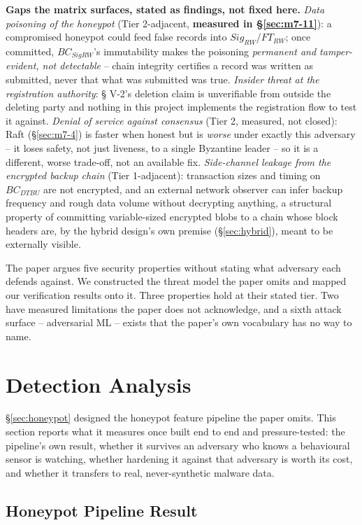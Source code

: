 \documentclass[conference]{IEEEtran}
\begin{document}
\textbf{Gaps the matrix surfaces, stated as findings, not fixed here.} \textit{Data poisoning of
the honeypot} (Tier 2-adjacent, \textbf{measured in \S\ref{sec:m7-11}}): a compromised honeypot
could feed false records into $Sig_{RW}$/$FT_{RW}$; once committed, $BC_{SigRW}$'s immutability
makes the poisoning \emph{permanent and tamper-evident, not detectable} -- chain integrity
certifies a record was written as submitted, never that what was submitted was true.
\textit{Insider threat at the registration authority}: \S
V-2's deletion claim is unverifiable from outside the deleting party and nothing in this project
implements the registration flow to test it against. \textit{Denial of service against consensus}
(Tier 2, measured, not closed): Raft (\S\ref{sec:m7-4}) is faster when honest but is
\emph{worse} under exactly this adversary -- it loses safety, not just liveness, to a single
Byzantine leader -- so it is a different, worse trade-off, not an available fix.
\textit{Side-channel leakage from the encrypted backup chain} (Tier 1-adjacent): transaction sizes
and timing on $BC_{DTBU}$ are not encrypted, and an external network observer can infer backup
frequency and rough data volume without decrypting anything, a structural property of committing
variable-sized encrypted blobs to a chain whose block headers are, by the hybrid design's own
premise (\S\ref{sec:hybrid}), meant to be externally visible.

The paper argues five security properties without stating what adversary each defends against. We
constructed the threat model the paper omits and mapped our verification results onto it. Three
properties hold at their stated tier. Two have measured limitations the paper does not
acknowledge, and a sixth attack surface -- adversarial ML -- exists that the paper's own
vocabulary has no way to name.
\section{Detection Analysis}
\label{sec:detection-analysis}

\S\ref{sec:honeypot} designed the honeypot feature pipeline the paper omits. This section reports
what it measures once built end to end and pressure-tested: the pipeline's own result, whether it
survives an adversary who knows a behavioural sensor is watching, whether hardening it against
that adversary is worth its cost, and whether it transfers to real, never-synthetic malware data.

\subsection{Honeypot Pipeline Result}
\label{sec:honeypot-eval}
\end{document}
